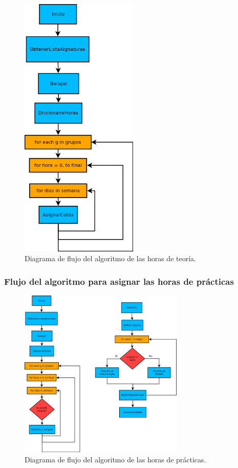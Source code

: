 \begin{figure}[H]
\centering
\includegraphics[width=0.5\textwidth]{img/d2}
\caption{Diagrama de flujo del algoritmo de las horas de teoría.}
\label{d2}
\end{figure}

\subsubsection{Flujo del algoritmo para asignar las horas de prácticas}

\begin{figure}[H]
\centering
\includegraphics[width=0.7\textwidth]{img/d3}
\caption{Diagrama de flujo del algoritmo de las horas de prácticas.}
\label{d3}
\end{figure}

